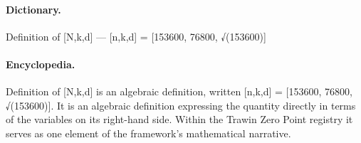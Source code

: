\paragraph{Dictionary.}
Definition of [N,k,d] — [n,k,d] = [153600, 76800, √(153600)]

\paragraph{Encyclopedia.}
Definition of [N,k,d] is an algebraic definition, written [n,k,d] = [153600, 76800, √(153600)]. It is an algebraic definition expressing the quantity directly in terms of the variables on its right-hand side. Within the Trawin Zero Point registry it serves as one element of the framework's mathematical narrative.
